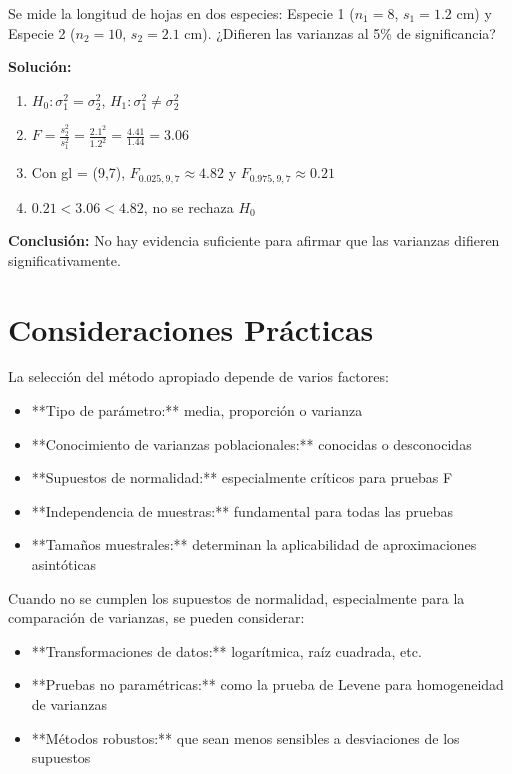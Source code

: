 \begin{example}
Se mide la longitud de hojas en dos especies: Especie 1 ($n_1=8$, $s_1=1.2$ cm) y Especie 2 ($n_2=10$, $s_2=2.1$ cm). ¿Difieren las varianzas al 5\% de significancia?

\textbf{Solución:}
\begin{enumerate}
    \item $H_0: \sigma_1^2 = \sigma_2^2$, $H_1: \sigma_1^2 \neq \sigma_2^2$
    \item $F = \frac{s_2^2}{s_1^2} = \frac{2.1^2}{1.2^2} = \frac{4.41}{1.44} = 3.06$
    \item Con gl = (9,7), $F_{0.025,9,7} \approx 4.82$ y $F_{0.975,9,7} \approx 0.21$
    \item $0.21 < 3.06 < 4.82$, no se rechaza $H_0$
\end{enumerate}
\textbf{Conclusión:} No hay evidencia suficiente para afirmar que las varianzas difieren significativamente.
\end{example}

\section{Consideraciones Prácticas}

\begin{remark}
La selección del método apropiado depende de varios factores:
\begin{itemize}
    \item **Tipo de parámetro:** media, proporción o varianza
    \item **Conocimiento de varianzas poblacionales:** conocidas o desconocidas
    \item **Supuestos de normalidad:** especialmente críticos para pruebas F
    \item **Independencia de muestras:** fundamental para todas las pruebas
    \item **Tamaños muestrales:** determinan la aplicabilidad de aproximaciones asintóticas
\end{itemize}
\end{remark}

\begin{remark}
Cuando no se cumplen los supuestos de normalidad, especialmente para la comparación de varianzas, se pueden considerar:
\begin{itemize}
    \item **Transformaciones de datos:** logarítmica, raíz cuadrada, etc.
    \item **Pruebas no paramétricas:** como la prueba de Levene para homogeneidad de varianzas
    \item **Métodos robustos:** que sean menos sensibles a desviaciones de los supuestos
\end{itemize}
\end{remark}

